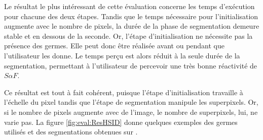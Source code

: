 Le résultat le plus intéressant de cette évaluation concerne les temps d'exécution pour chacune des deux étapes. Tandis que le temps nécessaire pour l'initialisation augmente avec le nombre de pixels, la durée de la phase de segmentation demeure stable et en dessous de la seconde. Or, l'étape d'initialisation ne nécessite pas la présence des germes. Elle peut donc être réalisée avant ou pendant que l'utilisateur les donne. Le temps perçu est alors réduit à la seule durée de la segmentation, permettant à l'utilisateur de percevoir une très bonne réactivité de $S \alpha F$.

Ce résultat est tout à fait cohérent, puisque l'étape d'initialisation travaille à l'échelle du pixel tandis que l'étape de segmentation manipule les superpixels. Or, si le nombre de pixels augmente avec  de l'image, le nombre de superpixels, lui, ne varie pas. La figure \ref{fig:eval:ResHSID} donne quelques exemples des germes utilisés et des segmentations obtenues sur .


